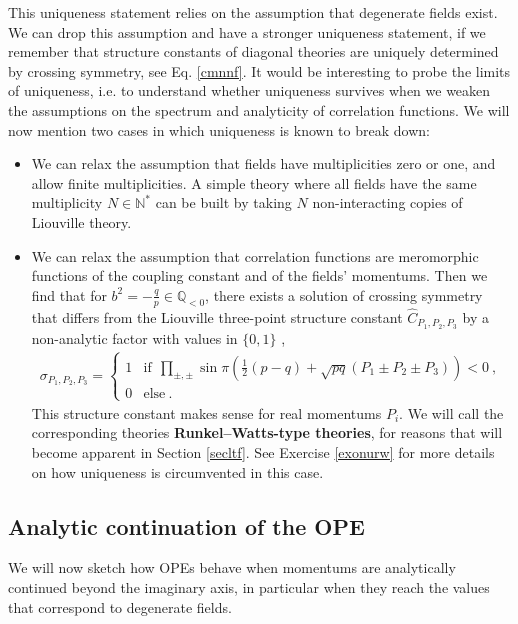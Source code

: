 \documentclass[12pt, a4paper, notitlepage, twoside]{report}
\numberwithin{equation}{section}
\theoremstyle{break}
\begin{document}
This uniqueness statement relies on the assumption that degenerate fields exist. We can drop this assumption and have a stronger uniqueness statement, if we remember that structure constants of diagonal theories are uniquely determined by crossing symmetry, see Eq. \eqref{cmnnf}. It would be interesting to probe the limits of uniqueness, i.e. to understand whether uniqueness survives when we weaken the assumptions on the spectrum and analyticity of correlation functions. We will now mention two cases in which uniqueness is known to break down:
\begin{itemize}
 \item We can relax the assumption that fields have multiplicities zero or one, and allow finite multiplicities. A simple theory where all fields have the same multiplicity $N\in\mathbb{N}^*$ can be built by taking $N$ non-interacting copies of Liouville theory.
 \item We can relax the assumption that correlation functions are meromorphic functions of the coupling constant and of the fields' momentums. Then we find that for $b^2=-\frac{q}{p}\in \mathbb{Q}_{<0}$, there exists a solution of crossing symmetry that differs from the Liouville three-point structure constant $\hat{C}_{P_1,P_2,P_3}$ by a non-analytic factor with values in $\{0,1\}$ \cite{rs15},
 \begin{align}
  \sigma_{P_1,P_2,P_3} = \left\{\begin{array}{cl} 1 & \text{if} \ \ \prod_{\pm,\pm} \sin\pi\left(\frac12(p-q)+\sqrt{pq}(P_1\pm P_2\pm P_3)\right) < 0\ , 
  \\ 0 & \text{else}\ . \end{array} \right.
  \label{sigma}
 \end{align}
This structure constant makes sense for real momentums $P_i$.
We will call the corresponding theories \textbf{Runkel--Watts-type theories}, for reasons that will become apparent in Section \ref{secltf}. See Exercise \ref{exonurw} for more details on how uniqueness is circumvented in this case. 
\end{itemize}


\subsection{Analytic continuation of the OPE}\label{secacl}

We will now sketch how OPEs behave when momentums are analytically continued beyond the imaginary axis, in particular when they reach the values that correspond to degenerate fields.
\end{document}
